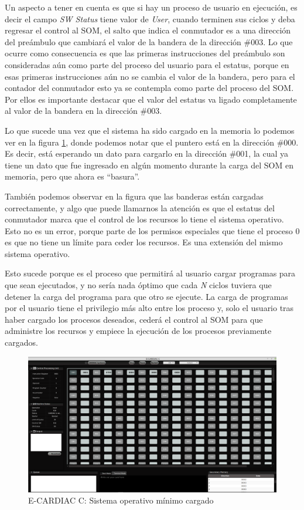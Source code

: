 \documentclass[letterpaper,12pt,oneside]{book}
\begin{document}
		Un aspecto a tener en cuenta es que si hay un proceso de usuario en ejecución, es decir el campo \textit{SW Status} tiene valor de \textit{User},
		cuando terminen sus ciclos y deba regresar el control al SOM, el salto que indica el conmutador es a una dirección del preámbulo 
		que cambiará el valor de la bandera de la dirección \#003.  Lo que ocurre como consecuencia es que
		las primeras instrucciones del preámbulo son consideradas aún como parte del proceso del usuario para el estatus, 
		porque
		en esas primeras instrucciones aún no se cambia el valor de la bandera, pero para el contador del conmutador esto ya se contempla como parte del
		proceso del SOM. Por ellos es importante destacar que el
		 valor del estatus va ligado completamente al valor de la bandera en la dirección \#003.
		
		Lo que sucede una vez que el sistema ha sido cargado en la memoria lo podemos ver en la figura \ref{fig:eccSOMcargado}, donde podemos notar que 
		el
		puntero está en la dirección \#000. Es decir, está esperando un dato para cargarlo en la dirección \#001, la cual ya tiene un dato que fue
		ingresado
		en algún momento durante la carga del SOM en memoria, pero que ahora es ``basura''.
  
        También podemos observar en la figura que las banderas están cargadas correctamente, y algo que puede llamarnos la atención
		es que el estatus del conmutador marca que el control de los recursos lo tiene el sistema operativo. Esto no es un error, porque parte de los 
		permisos especiales
		que tiene el proceso 0 es que no tiene un límite para ceder los recursos. Es una extensión del mismo sistema operativo. 
  
        Esto sucede porque es el proceso que permitirá
		al usuario cargar programas para que sean ejecutados, y no sería nada óptimo que cada \textit{N} ciclos tuviera que detener la carga del 
		programa para que otro se ejecute.
		La carga de programas por el usuario tiene el privilegio más alto entre los proceso y, solo el usuario tras haber cargado los procesos 
		deseados, cederá el control al SOM para que administre los recursos y empiece la ejecución de los procesos previamente cargados.
		
		\begin{figure}[h]		
			\centering
			\includegraphics[scale=0.32]{media/CARDIACC/ECARDIACC_socargado.png}
			\caption{E-CARDIAC C: Sistema operativo mínimo cargado}
			\label{fig:eccSOMcargado}
		\end{figure}
		
\end{document}
